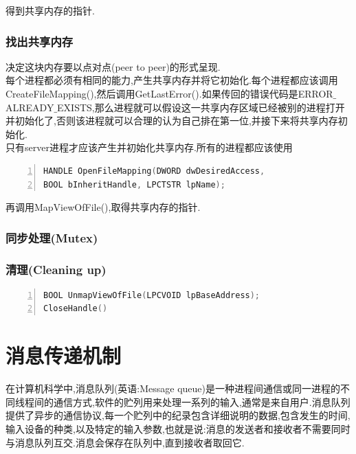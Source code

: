 \documentclass[a4paper,12pt,notitlepage]{article}
\begin{document}
	得到共享内存的指针. \\
	
\subsubsection{找出共享内存}

	决定这块内存要以点对点(peer to peer)的形式呈现. \\

	每个进程都必须有相同的能力,产生共享内存并将它初始化.每个进程都应该调用CreateFileMapping(),然后调用GetLastError().如果传回的错误代码是ERROR$\_$ALREADY$\_$EXISTS,那么进程就可以假设这一共享内存区域已经被别的进程打开并初始化了,否则该进程就可以合理的认为自己排在第一位,并接下来将共享内存初始化.\\

    只有server进程才应该产生并初始化共享内存.所有的进程都应该使用
    
\begin{lstlisting}[frame=shadowbox,numbers=left,language=C]
HANDLE OpenFileMapping(DWORD dwDesiredAccess, 
BOOL bInheritHandle, LPCTSTR lpName);
\end{lstlisting}

	再调用MapViewOfFile(),取得共享内存的指针. \\
	
\subsubsection{同步处理(Mutex)}

\subsubsection{清理(Cleaning up)}

\begin{lstlisting}[frame=shadowbox,numbers=left,language=C]
BOOL UnmapViewOfFile(LPCVOID lpBaseAddress);
CloseHandle()
\end{lstlisting}

\section{消息传递机制}

	在计算机科学中,消息队列(英语:Message queue)是一种进程间通信或同一进程的不同线程间的通信方式,软件的贮列用来处理一系列的输入,通常是来自用户.消息队列提供了异步的通信协议,每一个贮列中的纪录包含详细说明的数据,包含发生的时间,输入设备的种类,以及特定的输入参数,也就是说:消息的发送者和接收者不需要同时与消息队列互交.消息会保存在队列中,直到接收者取回它.\\
\end{document}

